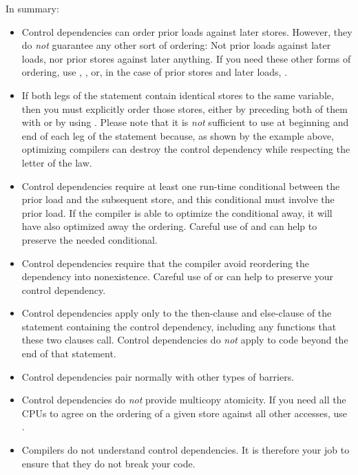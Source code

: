 In summary:

\begin{itemize}
\item Control dependencies can order prior loads against later stores.
      However, they do \emph{not} guarantee any other sort of ordering:
      Not prior loads against later loads, nor prior stores against
      later anything.
      If you need these other forms of ordering, use ,
      , or, in the case of prior stores and later
      loads, .

\item If both legs of the  statement contain identical stores to
      the same variable, then you must explicitly order those stores,
      either by preceding both of them with  or by using
      .
      Please note that it is \emph{not} sufficient to use 
      at beginning and end of each leg of the  statement
      because, as shown by the example above, optimizing compilers can
      destroy the control dependency while respecting the letter of the
       law.

\item Control dependencies require at least one run-time conditional
      between the prior load and the subsequent store, and this
      conditional must involve the prior load.
      If the compiler is able to optimize the conditional away, it will
      have also optimized away the ordering.
      Careful use of  and  can help to
      preserve the needed conditional.

\item Control dependencies require that the compiler avoid reordering the
      dependency into nonexistence.
      Careful use of  or  can
      help to preserve your control dependency.

\item Control dependencies apply only to the then-clause and else-clause
      of the  statement containing the control dependency, including
      any functions that these two clauses call.
      Control dependencies do \emph{not} apply to code beyond the end
      of that  statement.

\item Control dependencies pair normally with other types of barriers.

\item Control dependencies do \emph{not} provide multicopy atomicity.
      If you need all the CPUs to agree on the ordering of a given store
      against all other accesses, use .

\item Compilers do not understand control dependencies.
      It is therefore your job to ensure that they do not break your code.

\end{itemize}
